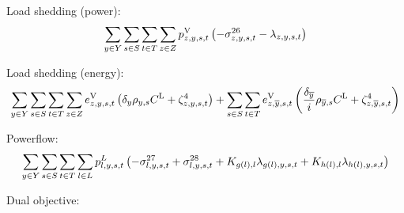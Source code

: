 \documentclass{article}
\newcommand{\sScenarios}{S}
\newcommand{\sIntervals}{T}
\newcommand{\sZones}{Z}
\newcommand{\sLinks}{L}
\newcommand{\iYear}{y}
\newcommand{\iYearTerminal}{\overline{\iYear}}
\newcommand{\iScenario}{s}
\newcommand{\iInterval}{t}
\newcommand{\iZone}{z}
\newcommand{\iLink}{l}
\newcommand{\cScenarioDuration}[1][\iYear,\iScenario]{\rho_{#1}}
\newcommand{\cInterestRate}{i}
\newcommand{\cIncidenceMatrix}[1][\iZone,\iLink]{K_{#1}}
\newcommand{\cLostLoadCost}{C^{\mathrm{L}}}
\newcommand{\cDiscountRate}[1][\iYear]{\delta_{#1}}
\newcommand{\vPowerFlow}[1][\iLink,\iYear,\iScenario,\iInterval]{p^{\sLinks}_{#1}}
\newcommand{\vLostLoadEnergy}[1][\iZone,\iYear,\iScenario,\iInterval]{e^{\mathrm{V}}_{#1}}
\newcommand{\vLostLoadPower}[1][\iZone,\iYear,\iScenario,\iInterval]{p^{\mathrm{V}}_{#1}}
\newcommand{\dNonNegativeLostLoad}[1][\iZone,\iYear,\iScenario,\iInterval]{\sigma_{#1}^{26}}
\newcommand{\dMinPowerFlow}[1][\iLink,\iYear,\iScenario,\iInterval]{\sigma_{#1}^{27}}
\newcommand{\dMaxPowerFlow}[1][\iLink,\iYear,\iScenario,\iInterval]{\sigma_{#1}^{28}}
\newcommand{\dPowerBalance}[1][\iZone,\iYear,\iScenario,\iInterval]{\lambda_{#1}}
\newcommand{\dLostLoadEnergy}[1][\iZone,\iYear,\iScenario,\iInterval]{\zeta_{#1}^{4}}
\begin{document}
Load shedding (power):
\begin{equation}
	\sumIntervals \sum\limits_{\iZone \in \sZones} \vLostLoadPower \left(- \dNonNegativeLostLoad - \dPowerBalance\right)
\end{equation}

Load shedding (energy):
\begin{equation}
	\sumIntervals \sum\limits_{\iZone \in \sZones} \vLostLoadEnergy \left(\cDiscountRate \cScenarioDuration \cLostLoadCost + \dLostLoadEnergy \right) + \sum\limits_{\iScenario \in \sScenarios}\sum\limits_{\iInterval \in \sIntervals} \vLostLoadEnergy[\iZone,\iYearTerminal,\iScenario,\iInterval] \left( \frac{\cDiscountRate[\iYearTerminal]}{\cInterestRate} \cScenarioDuration[\iYearTerminal,\iScenario] \cLostLoadCost + \dLostLoadEnergy[\iZone,\iYearTerminal,\iScenario,\iInterval] \right)
\end{equation}

Powerflow:
\begin{equation}
	\sumIntervals \sum\limits_{\iLink \in \sLinks} \vPowerFlow \left(-\dMinPowerFlow + \dMaxPowerFlow + \cIncidenceMatrix[g(\iLink), \iLink] \dPowerBalance[g(\iLink),\iYear,\iScenario,\iInterval] + \cIncidenceMatrix[h(\iLink), \iLink] \dPowerBalance[h(\iLink),\iYear,\iScenario,\iInterval]\right)
\end{equation}

Dual objective:
\end{document}
